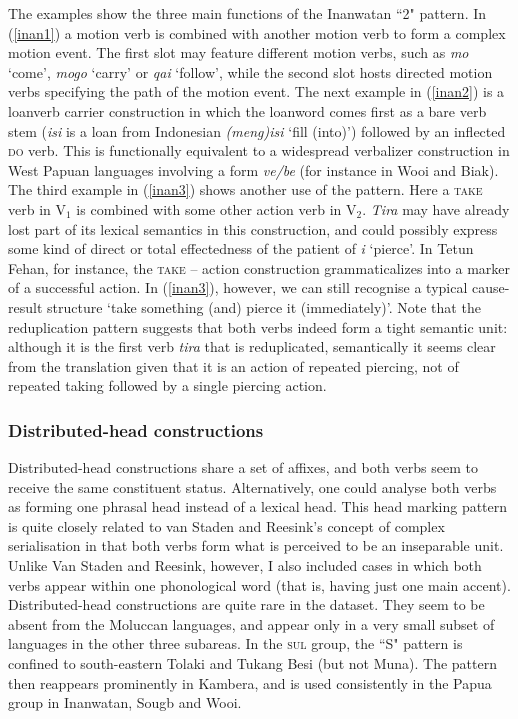 The examples show the three main functions of the Inanwatan ``2" pattern. In (\ref{inan1}) a motion verb is combined with another motion verb to form a complex motion event. The first slot may feature different motion verbs, such as \textit{mo} `come', \textit{mogo} `carry' or \textit{qai} `follow', while the second slot hosts directed motion verbs specifying the path of the motion event. The next example in (\ref{inan2}) is a loanverb carrier construction in which the loanword comes first as a bare verb stem (\textit{isi} is a loan from Indonesian \textit{(meng)isi} `fill (into)') followed by an inflected \textsc{do} verb. This is functionally equivalent to a widespread verbalizer construction in West Papuan languages involving a form \textit{ve/be} (for instance in Wooi and Biak). The third example in (\ref{inan3}) shows another use of the pattern. Here a \textsc{take} verb in V$_1$ is combined with some other action verb in V$_2$. \textit{Tira} may have already lost part of its lexical semantics in this construction, and could possibly express some kind of direct or total effectedness of the patient of \textit{i} `pierce'. In Tetun Fehan, for instance, the \textsc{take} -- action construction grammaticalizes into a marker of a successful action. In (\ref{inan3}), however, we can still recognise a typical cause-result structure `take something (and) pierce it (immediately)'. Note that the reduplication pattern suggests that both verbs indeed form a tight semantic unit: although it is the first verb \textit{tira} that is reduplicated, semantically it seems clear from the translation given that it is an action of repeated piercing, not of repeated taking followed by a single piercing action.

\subsubsection{Distributed-head constructions}

Distributed-head constructions share a set of affixes, and both verbs seem to receive the same constituent status. Alternatively, one could analyse both verbs as forming one phrasal head instead of a lexical head. This head marking pattern is quite closely related to van Staden and Reesink's concept of complex serialisation in that both verbs form what is perceived to be an inseparable unit. Unlike Van Staden and Reesink, however, I also included cases in which both verbs appear within one phonological word (that is, having just one main accent). Distributed-head constructions are quite rare in the dataset. They seem to be absent from the Moluccan languages, and appear only in a very small subset of languages in the other three subareas. In the \textsc{sul} group, the ``S" pattern is confined to south-eastern Tolaki and Tukang Besi (but not Muna). The pattern then reappears prominently in Kambera, and is used consistently in the Papua group in Inanwatan, Sougb and Wooi.

